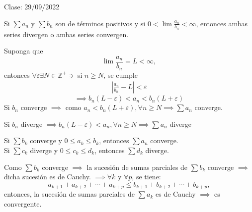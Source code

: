 Clase: 29/09/2022


\begin{prop}
    Si $\sum a_n$ y $\sum b_n$ son de términos positivos y si $0<\lim \frac{a_n}{b_n}<\infty$, entonces ambas series divergen o ambas series convergen. 
    \begin{dem}
        Suponga que $$\lim\frac{a_n}{b_n}=L<\infty,$$
        entonces $\forall \varepsilon\exists N\in\mathbb{Z}^+\ni$ si $n\geq N$, se cumple 
        \begin{align*}
            \left|\frac{a_n}{b_n}-L\right| <\varepsilon
        \end{align*}
        $$\implies b_n(L-\varepsilon)<a_n<b_n(L+\varepsilon)$$
        Si $b_n$ converge $\implies$ como $a_n<b_n(L+\varepsilon),\forall n\geq N\implies \sum a_n$ converge. 

        Si $b_n$ diverge $\implies b_n(L-\varepsilon)<a_n,\forall n\geq N\implies \sum a_n$ diverge 
    \end{dem}
\end{prop}

\begin{prop}
    Si $\sum b_k$ converge y $0\leq a_k\leq b_k$, entonces $\sum a_n$ converge.\\
    Si $\sum c_k$ diverge y $0\leq c_k\leq d_k$, entonces $\sum d_k$ diverge. 
    \begin{dem}
        Como $\sum b_k$ converge $\implies$
        la sucesión de sumas parciales de $\sum b_k$ converge $\implies$ dicha sucesión es de Cauchy. $\implies \forall k$ y $\forall p$, se tiene:
        $$a_{k+1}+a_{k+2}+\cdots+a_{k+p}\leq b_{k+1}+b_{k+2}+\cdots + b_{k+p},$$ 
        entonces, la sucesión de sumas parciales de $\sum a_k$ es de Cauchy $\implies$ es convergente. 
        
    \end{dem}
\end{prop}